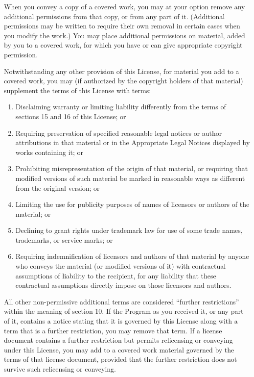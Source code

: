 \documentclass[10pt,a4paper,ngerman,titlepage,tocindentauto]{article}
\begin{document}
\begin{multicols}{3}
{\begin{enumerate}
						When you convey a copy of a covered work, you may at your option
						remove any additional permissions from that copy, or from any part of
						it.  (Additional permissions may be written to require their own
						removal in certain cases when you modify the work.)  You may place
						additional permissions on material, added by you to a covered work,
						for which you have or can give appropriate copyright permission.

						Notwithstanding any other provision of this License, for material you
						add to a covered work, you may (if authorized by the copyright holders of
						that material) supplement the terms of this License with terms:
						  \begin{enumerate}
						  \item Disclaiming warranty or limiting liability differently from the
						  terms of sections 15 and 16 of this License; or

						  \item Requiring preservation of specified reasonable legal notices or
						  author attributions in that material or in the Appropriate Legal
						  Notices displayed by works containing it; or

						  \item Prohibiting misrepresentation of the origin of that material, or
						  requiring that modified versions of such material be marked in
						  reasonable ways as different from the original version; or

						  \item Limiting the use for publicity purposes of names of licensors or
						  authors of the material; or

						  \item Declining to grant rights under trademark law for use of some
						  trade names, trademarks, or service marks; or

						  \item Requiring indemnification of licensors and authors of that
						  material by anyone who conveys the material (or modified versions of
						  it) with contractual assumptions of liability to the recipient, for
						  any liability that these contractual assumptions directly impose on
						  those licensors and authors.
						  \end{enumerate}

						All other non-permissive additional terms are considered ``further
						restrictions'' within the meaning of section 10.  If the Program as you
						received it, or any part of it, contains a notice stating that it is
						governed by this License along with a term that is a further
						restriction, you may remove that term.  If a license document contains
						a further restriction but permits relicensing or conveying under this
						License, you may add to a covered work material governed by the terms
						of that license document, provided that the further restriction does
						not survive such relicensing or conveying.


\end{enumerate}}
\end{multicols}
\end{document}
